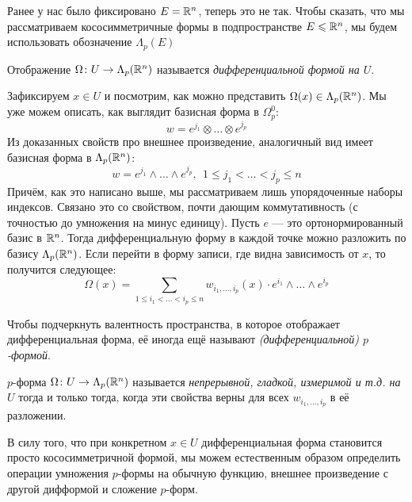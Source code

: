 \begin{note}
	Ранее у нас было фиксировано $E = \mathbb{R}^n$, теперь это не так. Чтобы сказать, что мы рассматриваем кососимметричные формы в подпространстве $E \leqslant \mathbb{R}^n$, мы будем использовать обозначение $\Lambda_p(E)$
\end{note}

\begin{definition}
	Отображение $\Omega \colon U \to \Lambda_p(\mathbb{R}^n)$ называется \textit{дифференциальной формой на $U$}.
\end{definition}

\begin{note}
	Зафиксируем $x \in U$ и посмотрим, как можно представить $\Omega(x) \in \Lambda_p(\mathbb{R}^n)$. Мы уже можем описать, как выглядит базисная форма в $\Omega_p^0$:
	\[
		w = e^{j_1} \otimes \ldots \otimes e^{j_p}
	\]
	Из доказанных свойств про внешнее произведение, аналогичный вид имеет базисная форма в $\Lambda_p(\mathbb{R}^n)$:
	\[
		w = e^{j_1} \wedge \ldots \wedge e^{j_p},\ \ 1 \le j_1 < \ldots < j_p \le n
	\]
	Причём, как это написано выше, мы рассматриваем лишь упорядоченные наборы индексов. Связано это со свойством, почти дающим коммутативность (с точностью до умножения на минус единицу). Пусть $e$ --- это ортонормированный базис в $\mathbb{R}^n$. Тогда дифференциальную форму в каждой точке можно разложить по базису $\Lambda_p(\mathbb{R}^n)$. Если перейти в форму записи, где видна зависимость от $x$, то получится следующее:
	\[
		\Omega(x) = \sum_{1 \le i_1 < \ldots < i_p \le n} w_{i_1, \ldots, i_p}(x) \cdot e^{i_1} \wedge \ldots \wedge e^{i_p}
	\]
\end{note}

\begin{note}
	Чтобы подчеркнуть валентность пространства, в которое отображает дифференциальная форма, её иногда ещё называют \textit{(дифференциальной) $p$-формой}.
\end{note}

\begin{definition}
	$p$-форма $\Omega \colon U \to \Lambda_p(\mathbb{R}^n)$ называется \textit{непрерывной, гладкой, измеримой и т.д. на $U$} тогда и только тогда, когда эти свойства верны для всех $w_{i_1, \ldots, i_p}$ в её разложении.
\end{definition}

\begin{note}
	В силу того, что при конкретном $x \in U$ дифференциальная форма становится просто кососимметричной формой, мы можем естественным образом определить операции умножения $p$-формы на обычную функцию, внешнее произведение с другой дифформой и сложение $p$-форм.
\end{note}


